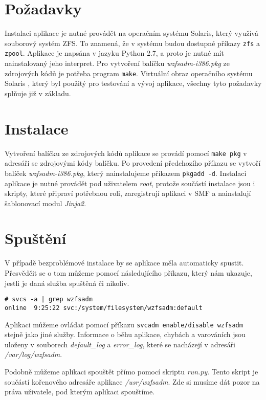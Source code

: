 \section{Požadavky}
Instalaci aplikace je nutné provádět na operačním systému Solaris, který využívá souborový systém ZFS. To znamená, že v systému budou dostupné příkazy \verb|zfs| a \verb|zpool|. Aplikace je napsána v jazyku Python 2.7, a proto je nutné mít nainstalovaný jeho interpret. Pro vytvoření balíčku \emph{wzfsadm-i386.pkg} ze zdrojových kódů je potřeba program \verb|make|. Virtuální obraz operačního systému Solaris \cite{vb}, který byl použitý pro testování a vývoj aplikace, všechny tyto požadavky splňuje již v základu.
\section{Instalace}
Vytvoření balíčku ze zdrojových kódů aplikace se provádí pomocí \verb|make pkg| v adresáři se zdrojovými kódy balíčku. Po provedení předchozího příkazu se vytvoří balíček \emph{wzfsadm-i386.pkg}, který nainstalujeme příkazem \verb|pkgadd -d|. Instalaci aplikace je nutné provádět pod uživatelem \emph{root}, protože součástí instalace jsou i skripty, které připraví potřebnou roli, zaregistrují aplikaci v SMF a nainstalují šablonovací modul \emph{Jinja2}.
\section{Spuštění} 
V případě bezproblémové instalace by se aplikace měla automaticky spustit. Přesvědčit se o tom můžeme pomocí následujícího příkazu, který nám ukazuje, jestli je daná služba spuštěná či nikoliv.
\begin{verbatim}
# svcs -a | grep wzfsadm
online  9:25:22 svc:/system/filesystem/wzfsadm:default
\end{verbatim}
Aplikaci můžeme ovládat pomocí příkazu \verb|svcadm enable/disable wzfsadm| stejně jako jiné služby. Informace o běhu aplikace, chybách a varováních jsou uloženy v souborech \emph{default\_log} a \emph{error\_log}, které se nacházejí v adresáři \emph{/var/log/wzfsadm}.

Podobně můžeme aplikaci spouštět přímo pomocí skriptu \emph{run.py}. Tento skript je součástí kořenového adresáře aplikace \emph{/usr/wzfsadm}. Zde si musíme dát pozor na práva uživatele, pod kterým aplikaci spouštíme.

